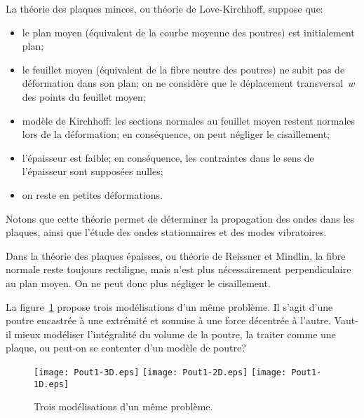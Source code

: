 \begin{histoire}
\medskip
La théorie des plaques minces, ou théorie de Love-Kirchhoff, suppose que:
\begin{itemize}
  \item le plan moyen (équivalent de la courbe moyenne des poutres) est initialement plan;
  \item le feuillet moyen (équivalent de la fibre neutre des poutres) ne subit pas de déformation dans son plan; on ne considère que le déplacement transversal~$w$ des points du feuillet moyen;
  \item modèle de Kirchhoff:
	les sections normales au feuillet moyen restent normales lors de la
	déformation; en conséquence, on peut négliger le cisaillement;
  \item l'épaisseur est faible; en conséquence, les contraintes dans le sens de l'épaisseur sont supposées nulles;
  \item on reste en petites déformations.
\end{itemize}
Notons que cette théorie permet de déterminer la propagation des ondes dans les plaques, ainsi que l'étude des ondes stationnaires et des modes vibratoires.

\medskip
Dans la théorie des plaques épaisses, ou théorie de Reissner et Mindlin, la fibre normale reste toujours rectiligne, mais n'est plus nécessairement perpendiculaire au plan moyen. On ne peut donc plus négliger le cisaillement.
\end{histoire}

\bigskip
La figure~\ref{Pout1} propose trois modélisations d'un même problème. Il s'agit d'une poutre encastrée à une extrémité et soumise à une force décentrée à l'autre. Vaut-il mieux modéliser l'intégralité du volume de la poutre, la traiter comme une plaque, ou peut-on se contenter d'un modèle de poutre?
\begin{figure}[ht]
\centering
\texttt{[image: Pout1-3D.eps]} \hfill
\texttt{[image: Pout1-2D.eps]} \hfill
\texttt{[image: Pout1-1D.eps]}
\caption{\label{Pout1} Trois modélisations d'un même problème.}
\end{figure}

